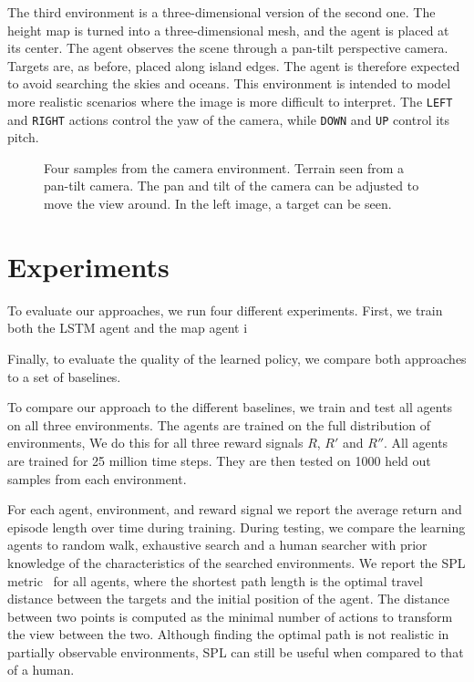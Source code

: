 The third environment is a three-dimensional version of the second one.
The height map is turned into a three-dimensional mesh, and the agent is placed at its center.
The agent observes the scene through a pan-tilt perspective camera.
Targets are, as before, placed along island edges.
The agent is therefore expected to avoid searching the skies and oceans.
This environment is intended to model more realistic scenarios where the image is more difficult to interpret.
The \texttt{LEFT} and \texttt{RIGHT} actions control the yaw of the camera, while \texttt{DOWN} and \texttt{UP} control its pitch.

\begin{figure}
    \centering
    
    \label{fig:camera}
    \caption[Camera environment]{Four samples from the camera environment. Terrain seen from a pan-tilt camera. The pan and tilt of the camera can be adjusted to move the view around. In the left image, a target can be seen.}
\end{figure}

\section{Experiments}
\label{sec:experiments}

To evaluate our approaches, we run four different experiments.
First, we train both the LSTM agent and the map agent i

Finally, to evaluate the quality of the learned policy, we compare both approaches to a set of baselines.


To compare our approach to the different baselines,
we train and test all agents on all three environments.
The agents are trained on the full distribution of environments,
We do this for all three reward signals \(R\), \(R'\) and \(R''\).
All agents are trained for 25 million time steps.
They are then tested on 1000 held out samples from each environment.

For each agent, environment, and reward signal we report the average return and episode length over time during training.
During testing, we compare the learning agents to random walk, exhaustive search and a human searcher with prior knowledge of the characteristics of the searched environments.
We report the SPL metric~\cite{anderson_evaluation_2018} for all agents, where the shortest path length is the optimal travel distance between the targets and the initial position of the agent.
The distance between two points is computed as the minimal number of actions to transform the view between the two.
Although finding the optimal path is not realistic in partially observable environments, SPL can still be useful when compared to that of a human.

